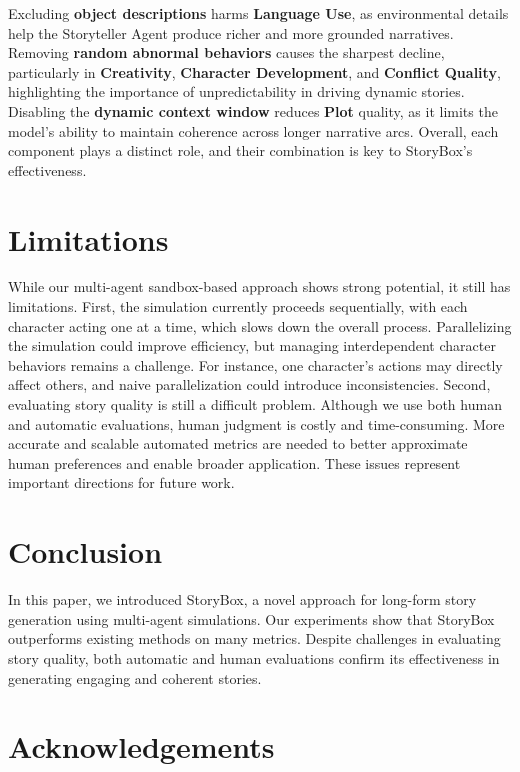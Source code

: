 \documentclass[letterpaper]{article} %
\begin{document}
Excluding \textbf{object descriptions} harms \textbf{Language Use}, as environmental details help the Storyteller Agent produce richer and more grounded narratives. Removing \textbf{random abnormal behaviors} causes the sharpest decline, particularly in \textbf{Creativity}, \textbf{Character Development}, and \textbf{Conflict Quality}, highlighting the importance of unpredictability in driving dynamic stories. Disabling the \textbf{dynamic context window} reduces \textbf{Plot} quality, as it limits the model's ability to maintain coherence across longer narrative arcs. Overall, each component plays a distinct role, and their combination is key to StoryBox's effectiveness.


\section{Limitations}

While our multi-agent sandbox-based approach shows strong potential, it still has limitations. First, the simulation currently proceeds sequentially, with each character acting one at a time, which slows down the overall process. Parallelizing the simulation could improve efficiency, but managing interdependent character behaviors remains a challenge. For instance, one character's actions may directly affect others, and naive parallelization could introduce inconsistencies. Second, evaluating story quality is still a difficult problem. Although we use both human and automatic evaluations, human judgment is costly and time-consuming. More accurate and scalable automated metrics are needed to better approximate human preferences and enable broader application. These issues represent important directions for future work.

\section{Conclusion}

In this paper, we introduced StoryBox, a novel approach for long-form story generation using multi-agent simulations. Our experiments show that StoryBox outperforms existing methods on many metrics. Despite challenges in evaluating story quality, both automatic and human evaluations confirm its effectiveness in generating engaging and coherent stories.

\section*{Acknowledgements}
\end{document}

